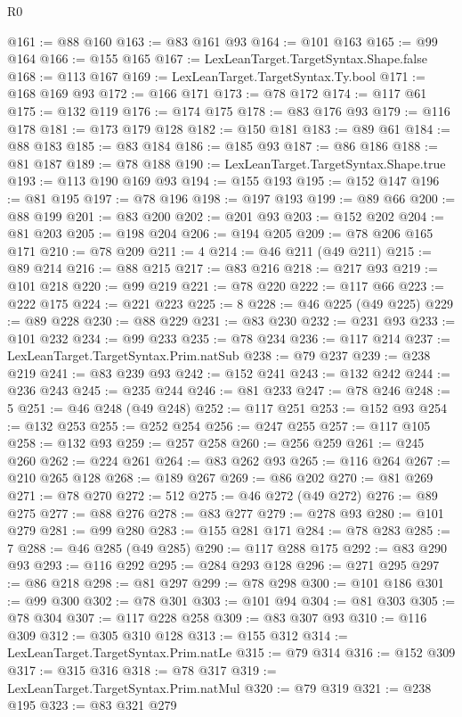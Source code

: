 \begin{lexlean}{R0}
\begin{coremodule}
@161 := @88 @160
@163 := @83 @161 @93
@164 := @101 @163
@165 := @99 @164
@166 := @155 @165
@167 := LexLeanTarget.TargetSyntax.Shape.false
@168 := @113 @167
@169 := LexLeanTarget.TargetSyntax.Ty.bool
@171 := @168 @169 @93
@172 := @166 @171
@173 := @78 @172
@174 := @117 @61
@175 := @132 @119
@176 := @174 @175
@178 := @83 @176 @93
@179 := @116 @178
@181 := @173 @179 @128
@182 := @150 @181
@183 := @89 @61
@184 := @88 @183
@185 := @83 @184
@186 := @185 @93
@187 := @86 @186
@188 := @81 @187
@189 := @78 @188
@190 := LexLeanTarget.TargetSyntax.Shape.true
@193 := @113 @190 @169 @93
@194 := @155 @193
@195 := @152 @147
@196 := @81 @195
@197 := @78 @196
@198 := @197 @193
@199 := @89 @66
@200 := @88 @199
@201 := @83 @200
@202 := @201 @93
@203 := @152 @202
@204 := @81 @203
@205 := @198 @204
@206 := @194 @205
@209 := @78 @206 @165 @171
@210 := @78 @209
@211 := 4
@214 := @46 @211 (@49 @211)
@215 := @89 @214
@216 := @88 @215
@217 := @83 @216
@218 := @217 @93
@219 := @101 @218
@220 := @99 @219
@221 := @78 @220
@222 := @117 @66
@223 := @222 @175
@224 := @221 @223
@225 := 8
@228 := @46 @225 (@49 @225)
@229 := @89 @228
@230 := @88 @229
@231 := @83 @230
@232 := @231 @93
@233 := @101 @232
@234 := @99 @233
@235 := @78 @234
@236 := @117 @214
@237 := LexLeanTarget.TargetSyntax.Prim.natSub
@238 := @79 @237
@239 := @238 @219
@241 := @83 @239 @93
@242 := @152 @241
@243 := @132 @242
@244 := @236 @243
@245 := @235 @244
@246 := @81 @233
@247 := @78 @246
@248 := 5
@251 := @46 @248 (@49 @248)
@252 := @117 @251
@253 := @152 @93
@254 := @132 @253
@255 := @252 @254
@256 := @247 @255
@257 := @117 @105
@258 := @132 @93
@259 := @257 @258
@260 := @256 @259
@261 := @245 @260
@262 := @224 @261
@264 := @83 @262 @93
@265 := @116 @264
@267 := @210 @265 @128
@268 := @189 @267
@269 := @86 @202
@270 := @81 @269
@271 := @78 @270
@272 := 512
@275 := @46 @272 (@49 @272)
@276 := @89 @275
@277 := @88 @276
@278 := @83 @277
@279 := @278 @93
@280 := @101 @279
@281 := @99 @280
@283 := @155 @281 @171
@284 := @78 @283
@285 := 7
@288 := @46 @285 (@49 @285)
@290 := @117 @288 @175
@292 := @83 @290 @93
@293 := @116 @292
@295 := @284 @293 @128
@296 := @271 @295
@297 := @86 @218
@298 := @81 @297
@299 := @78 @298
@300 := @101 @186
@301 := @99 @300
@302 := @78 @301
@303 := @101 @94
@304 := @81 @303
@305 := @78 @304
@307 := @117 @228 @258
@309 := @83 @307 @93
@310 := @116 @309
@312 := @305 @310 @128
@313 := @155 @312
@314 := LexLeanTarget.TargetSyntax.Prim.natLe
@315 := @79 @314
@316 := @152 @309
@317 := @315 @316
@318 := @78 @317
@319 := LexLeanTarget.TargetSyntax.Prim.natMul
@320 := @79 @319
@321 := @238 @195
@323 := @83 @321 @279

\end{coremodule}
\end{lexlean}
